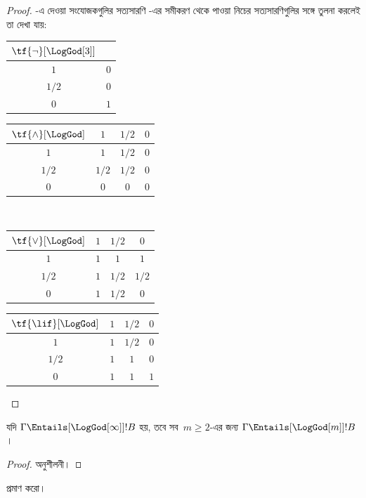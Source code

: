 \documentclass[../../../include/open-logic-section]{subfiles}
\begin{document}
\begin{proof}
  -এ দেওয়া সংযোজকগুলির সত্যসারণি
  -এর সমীকরণ থেকে পাওয়া নিচের সত্যসারণিগুলির
  সঙ্গে তুলনা করলেই তা দেখা যায়:
  \begin{center}
    \begin{tabular}{c|c}
      $\tf{\lnot}[\LogGod[3]]$ & \\
      \hline
      $1$ & $0$ \\
      $1/2$ & $0$ \\
      $0$ & $1$
    \end{tabular}
    \quad
    \begin{tabular}{c|ccc}
      $\tf{\land}[\LogGod]$ & $1$ & $1/2$ & $0$ \\
      \hline
      $1$ & $1$ & $1/2$ & $0$ \\
      $1/2$ & $1/2$ & $1/2$ & $0$\\
      $0$ & $0$ & $0$ & $0$
    \end{tabular}
    \\[2ex]
    \begin{tabular}{c|ccc}
      $\tf{\lor}[\LogGod]$ & $1$ & $1/2$ & $0$ \\
      \hline
      $1$ & $1$ & $1$ & $1$ \\
      $1/2$ & $1$ & $1/2$ & $1/2$ \\
      $0$ & $1$ & $1/2$ & $0$
    \end{tabular}
    \quad
    \begin{tabular}{c|ccc}
      $\tf{\lif}[\LogGod]$ & $1$ & $1/2$ & $0$ \\
      \hline
      $1$ & $1$ & $1/2$ & $0$ \\
      $1/2$ & $1$ & $1$ & $0$ \\
      $0$ & $1$ & $1$ & $1$
    \end{tabular}
  \end{center}
\end{proof}

\begin{prop}
  যদি $\Gamma \Entails[\LogGod[\infty]] !B$ হয়, তবে সব~$m \ge 2$-এর
  জন্য $\Gamma \Entails[\LogGod[m]] !B$।
\end{prop}

\begin{proof}
  অনুশীলনী।
\end{proof}

\begin{prob}
   প্রমাণ করো।
\end{prob}
\end{document}
